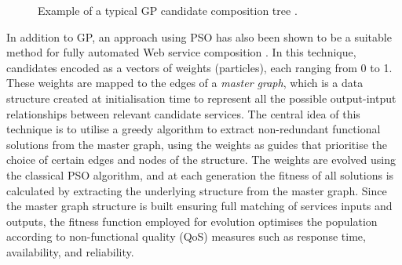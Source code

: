 \documentclass{article}
\begin{document}
\begin{figure}
\centerline{
}
\caption{Example of a typical GP candidate composition tree \protect\cite{aversano2006genetic}.}
\label{fig:treeExample}
\end{figure}

In addition to GP, an approach using PSO has also been shown to be a suitable method for fully automated Web service composition \cite{silva2014graph}. In this technique, candidates encoded as a vectors of weights (particles), each ranging from 0 to 1. These weights are mapped to the edges of a \textit{master graph}, which is a data structure created at 
initialisation time to represent all the possible output-intput relationships between relevant candidate services. The central idea of this technique is to utilise a greedy algorithm
to extract non-redundant functional solutions from the master graph, using the weights as guides that prioritise the choice of certain edges and nodes of the structure. The weights
are evolved using the classical PSO algorithm, and at each generation the fitness of all solutions is calculated by extracting the underlying structure from the master graph. Since
the master graph structure is built ensuring full matching of services inputs and outputs, the fitness function employed for evolution optimises the population according to non-functional quality (QoS) measures such as response time, availability, and reliability.
\end{document}
